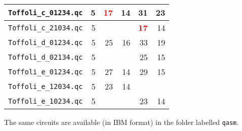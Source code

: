 \documentclass{article}
\newcommand\bred[1]{\textcolor{red}{\textbf{#1}}}
\begin{document}
\begin{tabu}{|l|r|r|r|r|r|}
   {\tt Toffoli\_c\_01234.qc} & 5 & \bred{17} & 14 & 31 & 23  \\  \hline
   {\tt Toffoli\_c\_21034.qc} & 5 &  &  & \bred{17} & 14 \\  \hline
   {\tt Toffoli\_d\_01234.qc} & 5 & 25 & 16 & 33 & 19 \\  \hline
   {\tt Toffoli\_d\_02134.qc} & 5 &  &  & 25 & 15 \\  \hline
   {\tt Toffoli\_e\_01234.qc} & 5 & 27 & 14 & 29 &  15 \\  \hline
   {\tt Toffoli\_e\_12034.qc} & 5 & 23 & 14 & & \\  \hline
   {\tt Toffoli\_e\_10234.qc} & 5 &  &  & 23 &  14 \\  \hline
\end{tabu} 
 
  
  \vspace{5mm}

The same circuits are available (in IBM format) in the folder labelled {\tt qasm}.

 
\end{document}
